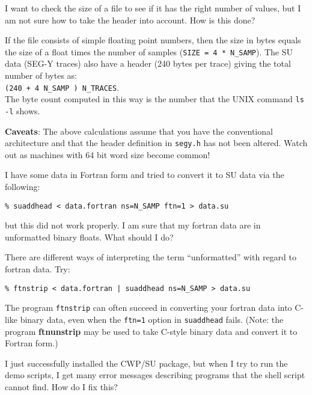 {{{{{{{\begin{question}
I want to check the size of a file to see if it has the right number
of values, but I am not sure how to take the header into account.
How is this done?
\end{question}

\begin{rmans}
If the file consists of simple floating point numbers, then the
size in bytes equals the size of a float times the number of
samples (\verb:SIZE = 4 * N_SAMP:).
The {\small\sf SU} data ({\sf SEG-Y} traces)
also have a header (240 bytes per trace)
giving the total number of bytes as:\\
\verb:(240 + 4 N_SAMP ) N_TRACES:.\\
\noindent
The byte count computed in this way
is the number that the UNIX command {\tt ls -l} shows.

{\bf Caveats}: The above calculations assume that you have
the conventional architecture and that the header definition
in {\tt segy.h} has not been altered.  Watch out as machines
with 64 bit word size become common!
\end{rmans}

\begin{question}
\label{SU:q:fortran}
I have some data in Fortran form and tried to convert it to {\small\sf SU} data
via the following:
{\small \begin{verbatim}
% suaddhead < data.fortran ns=N_SAMP ftn=1 > data.su
\end{verbatim}}\noindent
but this did not work properly. I am sure that my fortran data
are in unformatted binary floats. What should I do?
\end{question}

\begin{rmans}
There are different ways of interpreting the term ``unformatted''
with regard to fortran data.  Try:
{\small \begin{verbatim}
% ftnstrip < data.fortran | suaddhead ns=N_SAMP > data.su
\end{verbatim}}\noindent

The program {\tt ftnstrip} can often succeed in converting
your fortran data into C-like binary data, even when the
\verb:ftn=1: option in {\tt suaddhead} fails.
(Note: the program {\bf ftnunstrip\/} may be used to take C-style
binary data and convert it to Fortran form.)
\end{rmans} 

\begin{question}
I just successfully installed the {\sf CWP/SU} package, but when I
try to run the demo scripts, I get many error messages describing
programs that the shell script cannot find. How do I fix this?
\end{question}

}}}}}}}
